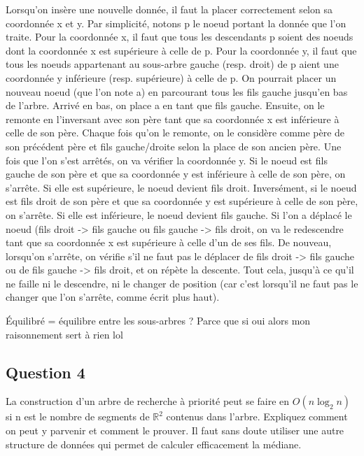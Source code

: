 \documentclass{article}
\newcommand{\black}{\color{black}}
\begin{document}
Lorsqu'on insère une nouvelle donnée, il faut la placer correctement selon sa coordonnée x et y. 
Par simplicité, notons p le noeud portant la donnée que l'on traite. 
Pour la coordonnée x, il faut que tous les descendants p soient des noeuds dont la coordonnée x est supérieure à celle de p. Pour la coordonnée y, 
il faut que tous les noeuds appartenant au sous-arbre gauche (resp. droit) de p aient une coordonnée y inférieure (resp. supérieure) à celle de p. 
On pourrait placer un nouveau noeud (que l'on note a) en parcourant tous les fils gauche jusqu'en bas de l'arbre. Arrivé en bas, on place a en tant que fils gauche. 
Ensuite, on le remonte en l'inversant avec son père tant que sa coordonnée x est inférieure à celle de son père. 
Chaque fois qu'on le remonte, on le considère comme père de son précédent père et fils gauche/droite selon la place de son ancien père. 
Une fois que l'on s'est arrêtés, on va vérifier la coordonnée y. Si le noeud est fils gauche de son père et que sa coordonnée y est inférieure à celle de son père, on s'arrête. 
Si elle est supérieure, le noeud devient fils droit. Inversément, si le noeud est fils droit de son père et que sa coordonnée y est supérieure à celle de son père, on s'arrête. 
Si elle est inférieure, le noeud devient fils gauche. Si l'on a déplacé le noeud (fils droit -> fils gauche ou fils gauche -> fils droit, 
on va le redescendre tant que sa coordonnée x est supérieure à celle d'un de ses fils. De nouveau, lorsqu'on s'arrête, 
on vérifie s'il ne faut pas le déplacer de fils droit -> fils gauche ou de fils gauche -> fils droit,
et on répète la descente. Tout cela, jusqu'à ce qu'il ne faille ni le descendre, ni le changer de position 
(car c'est lorsqu'il ne faut pas le changer que l'on s'arrête, comme écrit plus haut). 

Équilibré = équilibre entre les sous-arbres ? Parce que si oui alors mon raisonnement sert à rien lol

\black


\subsection{Question 4} La construction d'un arbre de recherche à priorité peut se faire en $O(n \log_2 n)$ si n est le nombre de segments de $\mathbb{R}^2$ contenus dans l'arbre.
Expliquez comment on peut y parvenir et comment le prouver. 
Il faut sans doute utiliser une autre structure de données qui permet de calculer efficacement la médiane.

\bigskip
\end{document}
